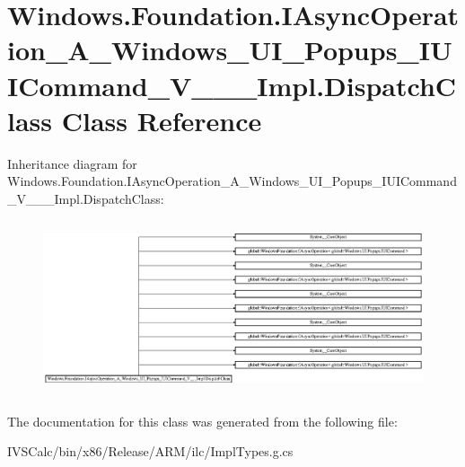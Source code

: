 \hypertarget{class_windows_1_1_foundation_1_1_i_async_operation___a___windows___u_i___popups___i_u_i_command_a1fcd741abacb8118717045e0ec34fd0}{}\section{Windows.\+Foundation.\+I\+Async\+Operation\+\_\+\+A\+\_\+\+Windows\+\_\+\+U\+I\+\_\+\+Popups\+\_\+\+I\+U\+I\+Command\+\_\+\+V\+\_\+\+\_\+\+\_\+\+Impl.\+Dispatch\+Class Class Reference}
\label{class_windows_1_1_foundation_1_1_i_async_operation___a___windows___u_i___popups___i_u_i_command_a1fcd741abacb8118717045e0ec34fd0}
Inheritance diagram for Windows.\+Foundation.\+I\+Async\+Operation\+\_\+\+A\+\_\+\+Windows\+\_\+\+U\+I\+\_\+\+Popups\+\_\+\+I\+U\+I\+Command\+\_\+\+V\+\_\+\+\_\+\+\_\+\+Impl.\+Dispatch\+Class\+:\begin{figure}[H]
\begin{center}
\leavevmode
\includegraphics[height=5.176471cm]{class_windows_1_1_foundation_1_1_i_async_operation___a___windows___u_i___popups___i_u_i_command_a1fcd741abacb8118717045e0ec34fd0}
\end{center}
\end{figure}


The documentation for this class was generated from the following file\+:\begin{DoxyCompactItemize}
\item 
I\+V\+S\+Calc/bin/x86/\+Release/\+A\+R\+M/ilc/Impl\+Types.\+g.\+cs\end{DoxyCompactItemize}
